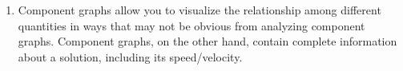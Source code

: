 \begin{enumerate}
\begin{enumerate}
				\item Component graphs allow you to visualize the relationship among different quantities in ways
				that may not be obvious from analyzing component graphs. Component graphs, on the other hand, contain
				complete information about a solution, including its speed/velocity.
			\end{enumerate}







\end{enumerate}
